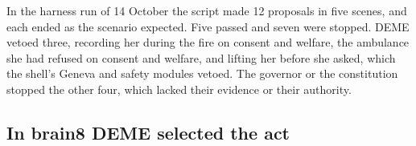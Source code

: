In the harness run of 14 October the script made 12 proposals in five scenes, and each ended as
the scenario expected. Five passed and seven were stopped. DEME vetoed three, recording her during
the fire on consent and welfare, the ambulance she had refused on consent and welfare, and lifting
her before she asked, which the shell's Geneva and safety modules vetoed. The governor or the
constitution stopped the other four, which lacked their evidence or their authority.

\subsection{In brain8 DEME selected the act}\label{sec:deme-stack}

